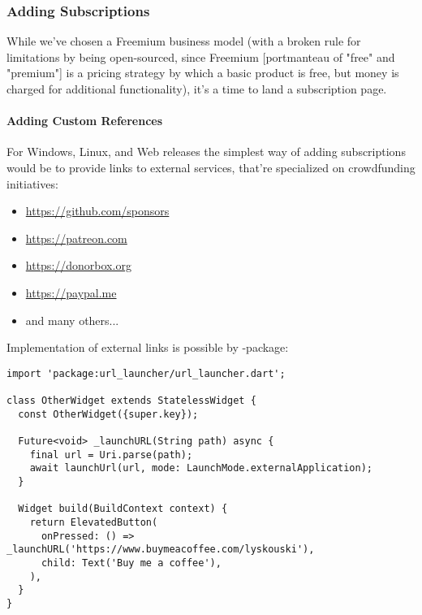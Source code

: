 
\subsubsection{Adding Subscriptions}

While we've chosen a Freemium business model (with a broken rule for limitations by being open-sourced, since Freemium 
[portmanteau of "free" and "premium"] is a pricing strategy by which a basic product is free, but money is charged for 
additional functionality), it's a time to land a subscription page.


\paragraph{Adding Custom References}

For Windows, Linux, and Web releases the simplest way of adding subscriptions would be to provide links to external 
services, that're specialized on crowdfunding initiatives:

\begin{itemize}
  \item  \href{https://github.com/sponsors}{https://github.com/sponsors}
  \item  \href{https://patreon.com}{https://patreon.com}
  \item  \href{https://donorbox.org}{https://donorbox.org}
  \item  \href{https://paypal.me}{https://paypal.me}
  \item  and many others...
\end{itemize}

\noindent Implementation of external links is possible by -package:

\begin{lstlisting}
import 'package:url_launcher/url_launcher.dart';

class OtherWidget extends StatelessWidget {
  const OtherWidget({super.key});

  Future<void> _launchURL(String path) async {
    final url = Uri.parse(path);
    await launchUrl(url, mode: LaunchMode.externalApplication);
  }

  Widget build(BuildContext context) {
    return ElevatedButton(
      onPressed: () => _launchURL('https://www.buymeacoffee.com/lyskouski'),
      child: Text('Buy me a coffee'),
    ),
  }
}
\end{lstlisting}


